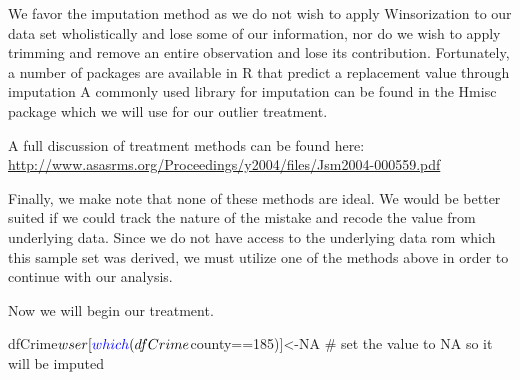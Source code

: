 \documentclass[]{article}
\newenvironment{Shaded}{}{}
\newcommand{\CommentTok}[1]{\textcolor[rgb]{0.00,0.50,0.00}{#1}}
\newcommand{\DecValTok}[1]{#1}
\newcommand{\KeywordTok}[1]{\textcolor[rgb]{0.00,0.00,1.00}{#1}}
\newcommand{\NormalTok}[1]{#1}
\newcommand{\OperatorTok}[1]{#1}
\newcommand{\OtherTok}[1]{\textcolor[rgb]{1.00,0.25,0.00}{#1}}
\begin{document}
We favor the imputation method as we do not wish to apply Winsorization
to our data set wholistically and lose some of our information, nor do
we wish to apply trimming and remove an entire observation and lose its
contribution. Fortunately, a number of packages are available in R that
predict a replacement value through imputation A commonly used library
for imputation can be found in the Hmisc package which we will use for
our outlier treatment.

A full discussion of treatment methods can be found here:
\url{http://www.asasrms.org/Proceedings/y2004/files/Jsm2004-000559.pdf}

Finally, we make note that none of these methods are ideal. We would be
better suited if we could track the nature of the mistake and recode the
value from underlying data. Since we do not have access to the
underlying data rom which this sample set was derived, we must utilize
one of the methods above in order to continue with our analysis.

Now we will begin our treatment.

\begin{Shaded}
\begin{Highlighting}[]
\NormalTok{dfCrime}\OperatorTok{$}\NormalTok{wser[}\KeywordTok{which}\NormalTok{(dfCrime}\OperatorTok{$}\NormalTok{county}\OperatorTok{==}\DecValTok{185}\NormalTok{)]<-}\OtherTok{NA} \CommentTok{# set the value to NA so it will be imputed}
\end{Highlighting}
\end{Shaded}
\end{document}
